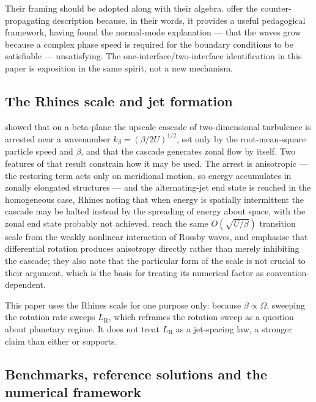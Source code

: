 Their framing should be adopted along with their algebra. \citet{heifetz1999} offer
the counter-propagating description because, in their words, it provides a useful
pedagogical framework, having found the normal-mode explanation --- that the waves
grow because a complex phase speed is required for the boundary conditions to be
satisfiable --- unsatisfying. The one-interface/two-interface identification in this
paper is exposition in the same spirit, not a new mechanism.

\subsection{The Rhines scale and jet formation}

\citet{rhines1975} showed that on a beta-plane the upscale cascade of
two-dimensional turbulence is arrested near a wavenumber
$k_\beta = (\beta/2U)^{1/2}$, set only by the root-mean-square particle speed and
$\beta$, and that the cascade generates zonal flow by itself. Two features of that
result constrain how it may be used. The arrest is anisotropic --- the restoring
term acts only on meridional motion, so energy accumulates in zonally elongated
structures --- and the alternating-jet end state is reached in the homogeneous case,
Rhines noting that when energy is spatially intermittent the cascade may be halted
instead by the spreading of energy about space, with the zonal end state probably
not achieved. \citet{vallis1993} reach the same $O(\sqrt{U/\beta})$ transition
scale from the weakly nonlinear interaction of Rossby waves, and emphasise that
differential rotation produces anisotropy directly rather than merely inhibiting
the cascade; they also note that the particular form of the scale is not crucial to
their argument, which is the basis for treating its numerical factor as
convention-dependent.

This paper uses the Rhines scale for one purpose only: because
$\beta \propto \Omega$, sweeping the rotation rate sweeps $L_{\mathrm R}$, which
reframes the rotation sweep as a question about planetary regime. It does not treat
$L_{\mathrm R}$ as a jet-spacing law, a stronger claim than either
\citet{rhines1975} or \citet{vallis1993} supports.

\subsection{Benchmarks, reference solutions and the numerical framework}

